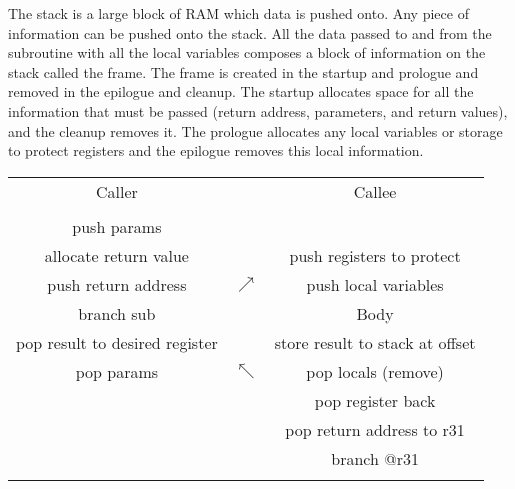 The stack is a large block of RAM which data is pushed onto.  Any piece of information can be pushed onto the stack.  All the data passed to and from the subroutine with all the local variables composes a block of information on the stack called the frame.  The frame is created in the startup and prologue and removed in the epilogue and cleanup.  The startup allocates space for all the information that must be passed (return address, parameters, and return values), and the cleanup removes it.  The prologue allocates any local variables or storage to protect registers and the epilogue removes this local information.

\begin{tabular}{|c|c|c|}
  \multicolumn{1}{c}{Caller} & \multicolumn{1}{c}{ } & \multicolumn{1}{c}{Callee} \\
   & \multicolumn{1}{c}{ } & \multicolumn{1}{c}{} \\ \cline{1-1}
  push params &  &  \\ \cline{3-3}
  allocate return value & & push registers to protect \\
  push return address  & $\nearrow$ & push local variables \\ \cline{3-3}
  branch sub     &   & Body \\ \cline{1-1} \cline{3-3}
  pop result to desired register &   & store result to stack at offset \\
  pop params   & $\nwarrow$ & pop locals (remove) \\
       &  & pop register back \\ \cline{1-1}
       &  & pop return address to r31 \\
       &  & branch @r31 \\ \cline{3-3}
  & & \\
\end{tabular}

